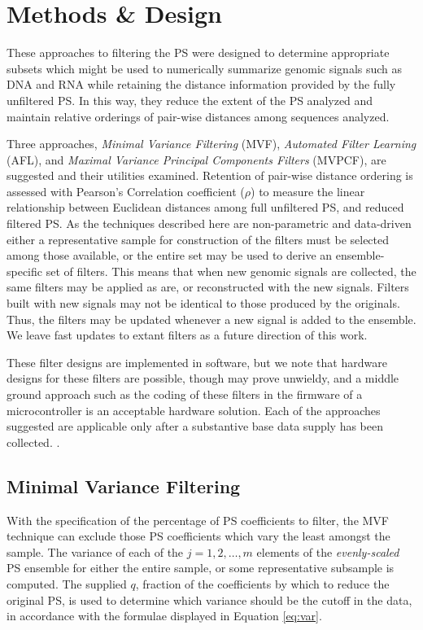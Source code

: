 \documentclass[10pt,conference]{IEEEtran}
\begin{document}
\section{Methods \& Design}
\label{sec:meth}

\noindent These approaches to filtering the PS were designed to determine appropriate subsets which might be used to numerically summarize genomic signals such as DNA and RNA while retaining the 
distance information provided by the fully unfiltered PS. 
In this way, they reduce the extent of the PS analyzed and maintain relative orderings of pair-wise distances among sequences analyzed.  

Three approaches, \textit{Minimal Variance Filtering} (MVF), \textit{Automated Filter 
Learning} (AFL), and \textit{Maximal Variance Principal Components Filters} (MVPCF), are suggested and their utilities examined.
Retention of pair-wise distance ordering is assessed with Pearson's Correlation coefficient ($\rho$) to measure the linear relationship between Euclidean distances among full unfiltered PS, and reduced filtered PS. 
As the techniques described here are non-parametric and data-driven either a representative sample 
for construction of the filters must be selected among those available, or the entire set may be used 
to derive an ensemble-specific set of filters. 
This means that when new genomic signals are collected, the same filters may be applied as are, or reconstructed with the new signals.
Filters built with new signals may not be identical to those  produced by the originals. 
Thus, the filters may be updated whenever a new signal is added to the ensemble. 
We leave fast updates to extant filters as a future direction of this work. 

These filter designs are implemented in software, but we note that hardware designs for 
these filters are possible, though may prove unwieldy, and a middle ground approach such as the 
coding of these filters in the firmware of a microcontroller is an acceptable hardware solution.  
Each of the approaches suggested are applicable only after a substantive base data supply has been 
collected. 
. 

\subsection{Minimal Variance Filtering} 

\noindent With the specification of the percentage of PS coefficients to filter,	 the MVF technique can exclude those PS coefficients which vary the least amongst the sample. 
The variance of each of the $j=1,2,\dots,m$ elements of the \textit{evenly-scaled} PS ensemble for either the entire sample, or some representative subsample is computed.
The supplied $q$, fraction of the coefficients by which to reduce the original PS, is used to determine which variance should be the cutoff in the data, in accordance with the formulae displayed in Equation \ref{eq:var}. 
\end{document}
